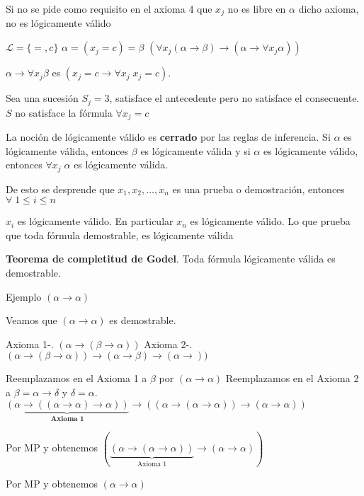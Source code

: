 \begin{observation}
Si no se pide como requisito en el axioma 4 que $x_j$ no es libre en $\alpha$ dicho axioma, no es l\'ogicamente v\'alido
\end{observation}

\begin{example}

$\mathcal{L} = \{ =, c\}$ $\alpha = (x_j = c) = \beta$ $(\forall x_j (\alpha \rightarrow \beta) \rightarrow (\alpha \rightarrow \forall x_j \alpha))$

$\alpha \rightarrow \forall x_j \beta$ es $(x_j = c \rightarrow \forall x_j \; x_j = c)$. 

\end{example}

Sea una sucesi\'on $S_j = 3$, satisface el antecedente pero no satisface el consecuente. $S$ no satisface la f\'ormula $\forall x_{j} = c$

La noci\'on de l\'ogicamente v\'alido es \textbf{cerrado} por las reglas de inferencia. Si $\alpha$ es l\'ogicamente v\'alida, entonces $\beta$ es l\'ogicamente v\'alida y si $\alpha$ es l\'ogicamente v\'alido, entonces $\forall x_j \; \alpha$ es l\'ogicamente v\'alida.

De esto se desprende que $x_1, x_2, \ldots, x_n$ es una prueba o demostraci\'on, entonces $\forall \;1 \leq i \leq n$

$x_i $ es l\'ogicamente v\'alido. En particular $x_n$ es l\'ogicamente v\'alido. Lo que prueba que toda f\'ormula demostrable, es l\'ogicamente v\'alida

\textbf{Teorema de completitud de Godel}. Toda f\'ormula l\'ogicamente v\'alida es demostrable.

Ejemplo $(\alpha \rightarrow \alpha)$

Veamos que $(\alpha \rightarrow \alpha)$ es demostrable. 

Axioma 1-. $(\alpha \rightarrow (\beta \rightarrow \alpha))$
Axioma 2-. $(\alpha \rightarrow (\beta \rightarrow \alpha)) \rightarrow (\alpha \rightarrow \beta) \rightarrow (\alpha \rightarrow))$

Reemplazamos en el Axioma 1 a $\beta$ por $(\alpha \rightarrow \alpha)$
Reemplazamos en el Axioma 2 a $\beta = \alpha \rightarrow \delta$ y $\delta = \alpha$. $\underbrace{(\alpha \rightarrow ((\alpha \rightarrow \alpha) \rightarrow \alpha))}_{\textbf{Axioma 1}} \rightarrow ((\alpha \rightarrow (\alpha \rightarrow \alpha)) \rightarrow (\alpha \rightarrow \alpha))$

Por MP y obtenemos $(\underbrace{(\alpha \rightarrow (\alpha \rightarrow \alpha))}_{\text{Axioma 1}} \rightarrow (\alpha \rightarrow \alpha))$

Por MP y obtenemos $(\alpha \rightarrow \alpha)$